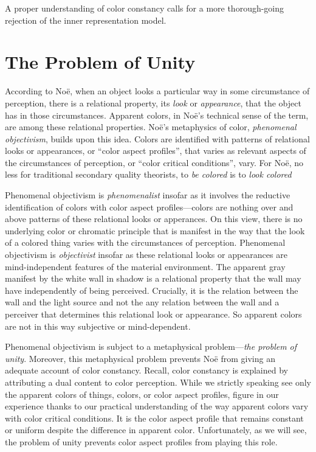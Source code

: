 \documentclass[12pt]{article}
\begin{document}
A proper understanding of color constancy calls for a more thorough-going rejection of the inner representation model.


\section{The Problem of Unity} %
\label{sec:the_problem_of_unity}

According to Noë, when an object looks a particular way in some circumstance of perception, there is a relational property, its \emph{look} or \emph{appearance}, that the object has in those circumstances. Apparent colors, in Noë's technical sense of the term, are among these relational properties. Noë's metaphysics of color, \emph{phenomenal objectivism}, builds upon this idea. Colors are identified with patterns of relational looks or appearances, or ``color aspect profiles'', that varies as relevant aspects of the circumstances of perception, or ``color critical conditions'', vary. For Noë, no less for traditional secondary quality theorists, to \emph{be colored} is to \emph{look colored} \citep[for more on the connection between phenomenal objectivism and secondary qualities see][]{Allen:2008kx} 

Phenomenal objectivism is \emph{phenomenalist} insofar as it involves the reductive identification of colors with color aspect profiles---colors are nothing over and above patterns of these relational looks or apperances. On this view, there is no underlying color or chromatic principle that is manifest in the way that the look of a colored thing varies with the circumstances of perception. Phenomenal objectivism is \emph{objectivist} insofar as these relational looks or appearances are mind-independent features of the material environment. The apparent gray manifest by the white wall in shadow is a relational property that the wall may have independently of being perceived. Crucially, it is the relation between the wall and the light source and not the any relation between the wall and a perceiver that determines this relational look or appearance. So apparent colors are not in this way subjective or mind-dependent.

Phenomenal objectivism is subject to a metaphysical problem---\emph{the problem of unity}. Moreover, this metaphysical problem prevents Noë from giving an adequate account of color constancy. Recall, color constancy is explained by attributing a dual content to color perception. While we strictly speaking see only the apparent colors of things, colors, or color aspect profiles, figure in our experience thanks to our practical understanding of the way apparent colors vary with color critical conditions. It is the color aspect profile that remains constant or uniform despite the difference in apparent color. Unfortunately, as we will see, the problem of unity prevents color aspect profiles from playing this role.
\end{document}
